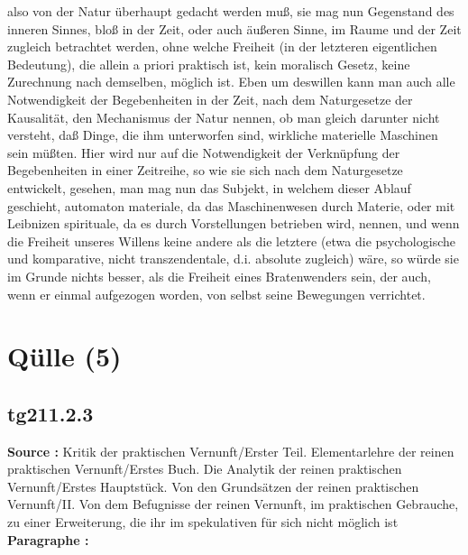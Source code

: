 \documentclass[a4paper,12pt,twoside]{book}
\newcommand{\unnumberedsection}[1]{
	\section*{#1}
	\addcontentsline{toc}{section}{#1}
	\markright{#1}
}
\begin{document}
also von der Natur überhaupt gedacht werden muß, sie mag nun Gegenstand des inneren Sinnes, bloß in der Zeit, oder auch äußeren Sinne, im Raume und der Zeit zugleich betrachtet werden, ohne welche Freiheit (in der letzteren eigentlichen Bedeutung), die allein a priori praktisch ist, kein moralisch Gesetz, keine Zurechnung nach demselben, möglich ist. Eben um deswillen kann man auch alle Notwendigkeit der Begebenheiten in der Zeit, nach dem Naturgesetze der Kausalität, den Mechanismus der Natur nennen, ob man gleich darunter nicht versteht, daß Dinge, die ihm unterworfen sind, wirkliche materielle Maschinen sein müßten. Hier wird nur auf die Notwendigkeit der Verknüpfung der Begebenheiten in einer Zeitreihe, so wie sie sich nach dem Naturgesetze entwickelt, gesehen, man mag nun das Subjekt, in welchem dieser Ablauf geschieht, automaton materiale, da das Maschinenwesen durch Materie, oder mit Leibnizen spirituale, da es durch Vorstellungen betrieben wird, nennen, und wenn die Freiheit unseres Willens keine andere als die letztere (etwa die psychologische und komparative, nicht transzendentale, d.i. absolute zugleich) wäre, so würde sie im Grunde nichts besser, als die Freiheit eines Bratenwenders sein, der auch, wenn er einmal aufgezogen worden, von selbst seine Bewegungen verrichtet. 
	
	\unnumberedsection{Qülle (5)} 
	\subsection*{tg211.2.3} 
	\textbf{Source : }Kritik der praktischen Vernunft/Erster Teil. Elementarlehre der reinen praktischen Vernunft/Erstes Buch. Die Analytik der reinen praktischen Vernunft/Erstes Hauptstück. Von den Grundsätzen der reinen praktischen Vernunft/II. Von dem Befugnisse der reinen Vernunft, im praktischen Gebrauche, zu einer Erweiterung, die ihr im spekulativen für sich nicht möglich ist\\  
	
	\noindent\textbf{Paragraphe : }
	
\end{document}
